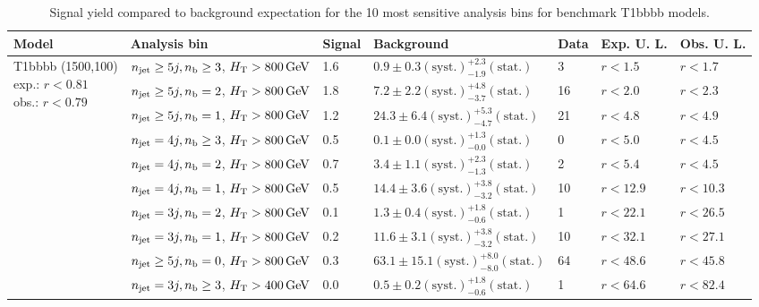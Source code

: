 \begin{table}[h!] 
  \scriptsize
  \caption{ 
Signal yield compared to background expectation for the 10 most sensitive analysis bins 
for benchmark T1bbbb models.
  \label{tab:sigBenchmarksYields_T1bbbb}}
  \centering 
  \begin{tabular}{ lllllll } 
    \hline 
    \hline 
    Model & Analysis bin & Signal & Background & Data & Exp. U. L. & Obs. U. L. \\ \hline
\multirow{10}{*}{\parbox[t]{2cm}{T1bbbb (1500,100)\\exp.: $r<0.81$\\obs.: $r<0.79$}}
 & $n_{\mathrm{jet}} \geq5j,n_{\text{b}} \geq3$, $\mbox{$H_\text{T}$} > 800 \, \mathrm{GeV}$ & 1.6 & $0.9 \pm 0.3 \mathrm{(syst.)} ^{+2.3}_{-1.9} \mathrm{(stat.)}$ & 3 & $r < 1.5$ & $r < 1.7$\\ 
 & $n_{\mathrm{jet}} \geq5j,n_{\text{b}} =2$, $\mbox{$H_\text{T}$} > 800 \, \mathrm{GeV}$ & 1.8 & $7.2 \pm 2.2 \mathrm{(syst.)} ^{+4.8}_{-3.7} \mathrm{(stat.)}$ & 16 & $r < 2.0$ & $r < 2.3$\\ 
 & $n_{\mathrm{jet}} \geq5j,n_{\text{b}} =1$, $\mbox{$H_\text{T}$} > 800 \, \mathrm{GeV}$ & 1.2 & $24.3 \pm 6.4 \mathrm{(syst.)} ^{+5.3}_{-4.7} \mathrm{(stat.)}$ & 21 & $r < 4.8$ & $r < 4.9$\\ 
 & $n_{\mathrm{jet}} =4j,n_{\text{b}} \geq3$, $\mbox{$H_\text{T}$} > 800 \, \mathrm{GeV}$ & 0.5 & $0.1 \pm 0.0 \mathrm{(syst.)} ^{+1.3}_{-0.0} \mathrm{(stat.)}$ & 0 & $r < 5.0$ & $r < 4.5$\\ 
 & $n_{\mathrm{jet}} =4j,n_{\text{b}} =2$, $\mbox{$H_\text{T}$} > 800 \, \mathrm{GeV}$ & 0.7 & $3.4 \pm 1.1 \mathrm{(syst.)} ^{+2.3}_{-1.3} \mathrm{(stat.)}$ & 2 & $r < 5.4$ & $r < 4.5$\\ 
 & $n_{\mathrm{jet}} =4j,n_{\text{b}} =1$, $\mbox{$H_\text{T}$} > 800 \, \mathrm{GeV}$ & 0.5 & $14.4 \pm 3.6 \mathrm{(syst.)} ^{+3.8}_{-3.2} \mathrm{(stat.)}$ & 10 & $r < 12.9$ & $r < 10.3$\\ 
 & $n_{\mathrm{jet}} =3j,n_{\text{b}} =2$, $\mbox{$H_\text{T}$} > 800 \, \mathrm{GeV}$ & 0.1 & $1.3 \pm 0.4 \mathrm{(syst.)} ^{+1.8}_{-0.6} \mathrm{(stat.)}$ & 1 & $r < 22.1$ & $r < 26.5$\\ 
 & $n_{\mathrm{jet}} =3j,n_{\text{b}} =1$, $\mbox{$H_\text{T}$} > 800 \, \mathrm{GeV}$ & 0.2 & $11.6 \pm 3.1 \mathrm{(syst.)} ^{+3.8}_{-3.2} \mathrm{(stat.)}$ & 10 & $r < 32.1$ & $r < 27.1$\\ 
 & $n_{\mathrm{jet}} \geq5j,n_{\text{b}} =0$, $\mbox{$H_\text{T}$} > 800 \, \mathrm{GeV}$ & 0.3 & $63.1 \pm 15.1 \mathrm{(syst.)} ^{+8.0}_{-8.0} \mathrm{(stat.)}$ & 64 & $r < 48.6$ & $r < 45.8$\\ 
 & $n_{\mathrm{jet}} =3j,n_{\text{b}} \geq3$, $\mbox{$H_\text{T}$} > 400 \, \mathrm{GeV}$ & 0.0 & $0.5 \pm 0.2 \mathrm{(syst.)} ^{+1.8}_{-0.6} \mathrm{(stat.)}$ & 1 & $r < 64.6$ & $r < 82.4$\\ \hline

\end{tabular}
\end{table}
